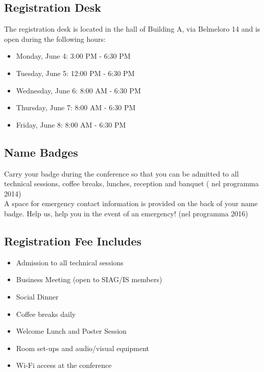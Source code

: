 \begin{multicols}{2}
\section*{Registration Desk}
The registration desk is located in the hall of Building A, via Belmeloro 14 and is open during the following hours:
\begin{itemize}
\item Monday, June 4: 3:00 PM - 6:30 PM
\item Tuesday, June 5: 12:00 PM - 6:30 PM
\item Wednesday, June 6: 8:00 AM - 6:30 PM
\item Thursday, June 7: 8:00 AM - 6:30 PM
\item Friday, June 8: 8:00 AM - 6:30 PM
\end{itemize}
\subsection*{Name Badges} Carry your badge during the conference so that you can be admitted to all technical sessions, coffee breaks, lunches, reception and banquet ( nel programma 2014)\\
A space for emergency contact information is provided on the back of your name badge. Help us, help you in the event of an emergency! (nel programma 2016)
\subsection*{Registration Fee Includes}
\begin{itemize}
\item Admission to all technical sessions
\item Business Meeting (open to SIAG/IS members)
\item Social Dinner
\item Coffee breaks daily
\item Welcome Lunch and Poster Session
\item Room set-ups and audio/visual equipment
\item Wi-Fi access at the conference
\end{itemize}%

\end{multicols}
